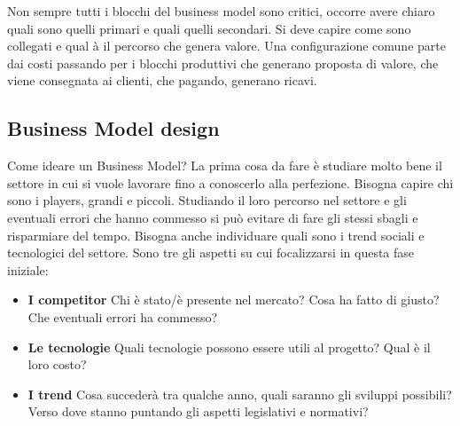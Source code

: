 Non sempre tutti i blocchi del business model sono critici, occorre avere
chiaro quali sono quelli primari e quali quelli secondari. Si deve capire come
sono collegati e qual à il percorso che genera valore. Una configurazione
comune parte dai costi passando per i blocchi produttivi che generano proposta
di valore, che viene consegnata ai clienti, che pagando, generano ricavi.

\subsection{Business Model design}

Come ideare un Business Model? La prima cosa da fare è studiare molto bene il
settore in cui si vuole lavorare fino a conoscerlo alla perfezione.
Bisogna capire chi sono i players, grandi e piccoli. Studiando il loro
percorso nel settore e gli eventuali errori che hanno commesso si può
evitare di fare gli stessi sbagli e risparmiare del tempo. Bisogna anche
individuare quali sono i trend sociali e tecnologici del settore.
Sono tre gli aspetti su cui focalizzarsi in questa fase iniziale:

\begin{itemize}

\item \textbf{I competitor} Chi è stato/è presente nel mercato?
Cosa ha fatto di giusto? Che eventuali errori ha commesso?

\item \textbf{Le tecnologie} Quali tecnologie possono essere utili al progetto?
Qual è il loro costo?

\item \textbf{I trend} Cosa succederà tra qualche anno, quali saranno gli
sviluppi possibili? Verso dove stanno puntando gli aspetti legislativi e
normativi? 

\end{itemize}
